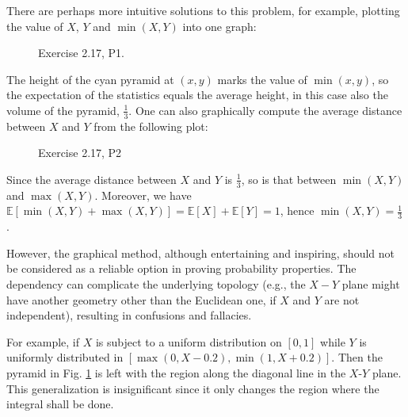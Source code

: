 \documentclass[UTF8]{ctexart}
\begin{document}
There are perhaps more intuitive solutions to this problem, for example, plotting the value of $X$, $Y$ and $\min(X,Y)$ into one graph:
\begin{figure}[htbp]
\centering
{}
\caption{Exercise 2.17, P1.}
\label{figure:2.1}
\end{figure}
The height of the cyan pyramid at $(x,y)$ marks the value of $\min(x,y)$, so the expectation of the statistics equals the average height, in this case also the volume of the pyramid, $\frac{1}{3}$.
One can also graphically compute the average distance between $X$ and $Y$ from the following plot:
\begin{figure}[htbp]
\centering
{}
\caption{Exercise 2.17, P2}
\end{figure}
Since the average distance between $X$ and $Y$ is $\frac{1}{3}$, so is that between $\min(X,Y)$ and $\max(X,Y)$.
Moreover, we have $\mathbb{E}[\min(X,Y)+\max(X,Y)]=\mathbb{E}[X]+\mathbb{E}[Y]=1$, hence $\min(X,Y)=\frac{1}{3}$.

However, the graphical method, although entertaining and inspiring, should not be considered as a reliable option in proving probability properties.
The dependency can complicate the underlying topology (e.g., the $X-Y$ plane might have another geometry other than the Euclidean one, if $X$ and $Y$ are not independent), resulting in confusions and fallacies.

For example, if $X$ is subject to a uniform distribution on $[0,1]$ while $Y$ is uniformly distributed in $[\max(0,X-0.2),\min(1,X+0.2)]$.
Then the pyramid in Fig. \ref{figure:2.1} is left with the region along the diagonal line in the $X$-$Y$ plane.
This generalization is insignificant since it only changes the region where the integral shall be done.
\end{document}
